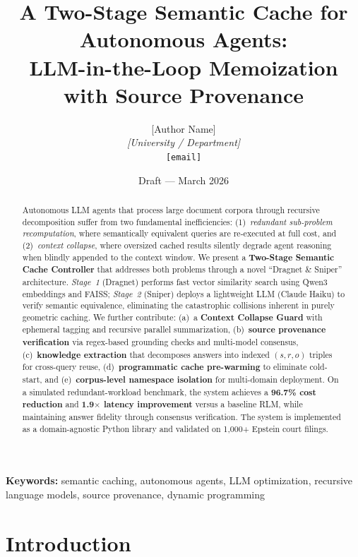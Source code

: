 \documentclass[11pt,twocolumn]{article}
\title{%
    \textbf{A Two-Stage Semantic Cache for Autonomous Agents: \\
    LLM-in-the-Loop Memoization with Source Provenance}%
}
\author{
    [Author Name] \\
    \textit{[University / Department]} \\
    \texttt{[email]}
}
\date{Draft — March 2026}
\begin{document}
\maketitle

\begin{abstract}
Autonomous LLM agents that process large document corpora through recursive decomposition suffer from two fundamental inefficiencies: (1)~\textit{redundant sub-problem recomputation}, where semantically equivalent queries are re-executed at full cost, and (2)~\textit{context collapse}, where oversized cached results silently degrade agent reasoning when blindly appended to the context window. We present a \textbf{Two-Stage Semantic Cache Controller} that addresses both problems through a novel ``Dragnet \& Sniper'' architecture. \textit{Stage~1} (Dragnet) performs fast vector similarity search using Qwen3 embeddings and FAISS; \textit{Stage~2} (Sniper) deploys a lightweight LLM (Claude Haiku) to verify semantic equivalence, eliminating the catastrophic collisions inherent in purely geometric caching. We further contribute: (a)~a \textbf{Context Collapse Guard} with ephemeral tagging and recursive parallel summarization, (b)~\textbf{source provenance verification} via regex-based grounding checks and multi-model consensus, (c)~\textbf{knowledge extraction} that decomposes answers into indexed $(s, r, o)$ triples for cross-query reuse, (d)~\textbf{programmatic cache pre-warming} to eliminate cold-start, and (e)~\textbf{corpus-level namespace isolation} for multi-domain deployment. On a simulated redundant-workload benchmark, the system achieves a \textbf{96.7\% cost reduction} and \textbf{1.9$\times$ latency improvement} versus a baseline RLM, while maintaining answer fidelity through consensus verification. The system is implemented as a domain-agnostic Python library and validated on 1,000+ Epstein court filings.
\end{abstract}

\textbf{Keywords:} semantic caching, autonomous agents, LLM optimization, recursive language models, source provenance, dynamic programming

\section{Introduction}
\label{sec:intro}
\end{document}
